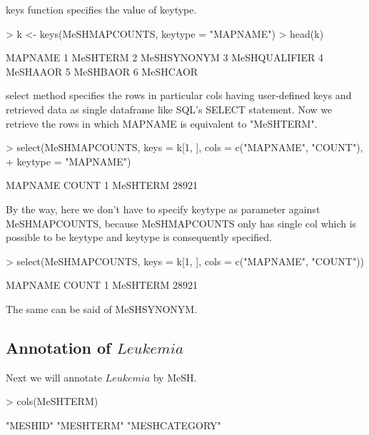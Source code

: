 \documentclass[11pt]{article}
\begin{document}
\newpage
keys function specifies the value of keytype.
\begin{center}
\begin{Schunk}
\begin{Sinput}
> k <- keys(MeSHMAPCOUNTS, keytype = "MAPNAME")
> head(k)
\end{Sinput}
\begin{Soutput}
        MAPNAME
1      MeSHTERM
2   MeSHSYNONYM
3 MeSHQUALIFIER
4      MeSHAAOR
5      MeSHBAOR
6      MeSHCAOR
\end{Soutput}
\end{Schunk}
\end{center}


select method specifies the rows in particular cols having user-defined keys and retrieved data as single dataframe like SQL's SELECT statement. Now we retrieve the rows in which MAPNAME is equivalent to "MeSHTERM".
\begin{center}
\begin{Schunk}
\begin{Sinput}
> select(MeSHMAPCOUNTS, keys = k[1, ], cols = c("MAPNAME", "COUNT"), 
+     keytype = "MAPNAME")
\end{Sinput}
\begin{Soutput}
   MAPNAME COUNT
1 MeSHTERM 28921
\end{Soutput}
\end{Schunk}
\end{center}


By the way, here we don't have to specify keytype as parameter against MeSHMAPCOUNTS, because MeSHMAPCOUNTS only has single col which is possible to be keytype and keytype is consequently specified.
\begin{center}
\begin{Schunk}
\begin{Sinput}
> select(MeSHMAPCOUNTS, keys = k[1, ], cols = c("MAPNAME", "COUNT"))
\end{Sinput}
\begin{Soutput}
   MAPNAME COUNT
1 MeSHTERM 28921
\end{Soutput}
\end{Schunk}
\end{center}
The same can be said of MeSHSYNONYM.

\newpage
\subsection{Annotation of $Leukemia$}


Next we will annotate $Leukemia$ by MeSH.
\begin{center}
\begin{Schunk}
\begin{Sinput}
> cols(MeSHTERM)
\end{Sinput}
\begin{Soutput}
[1] "MESHID"       "MESHTERM"     "MESHCATEGORY"
\end{Soutput}
\end{Schunk}
\end{center}
\end{document}
